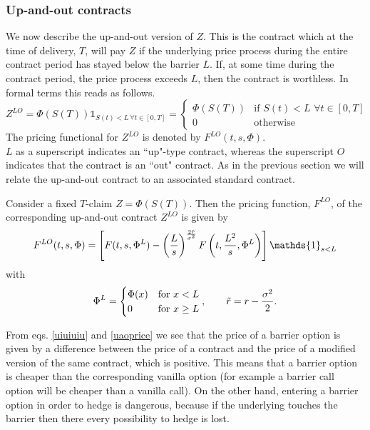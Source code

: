 \subsubsection{Up-and-out contracts}
We now describe the up-and-out version of $Z$. This is the contract which at the time of delivery, $T$, will pay $Z$ if the underlying price process during the entire contract period has stayed below the barrier $L$. If, at some time during the contract period, the price process exceeds $L$, then the contract is worthless. In formal terms this reads as follows.
\begin{equation}
    Z^{LO} = \Phi(S(T))\mathds{1}_{S(t)<L\,\forall t\in[0,T]} =
    \begin{cases}
    \Phi(S(T)) & \text{if } S(t)<L\,\,\forall t\in[0,T] \\
    0 & \text{otherwise}
    \end{cases}
\end{equation}
The pricing functional for $Z^{LO}$ is denoted by $F^{LO}(t,s,\Phi)$.\\
$L$ as a superscript indicates an ``up"-type contract, whereas the superscript $O$ indicates that the contract is an ``out" contract. As in the previous section we will relate the up-and-out contract to an associated standard contract.
\begin{theorem}
    Consider a fixed $T$-claim $Z = \Phi(S(T))$. Then the pricing function, $F^{LO}$, of the corresponding up-and-out contract $Z^{LO}$ is given by
    \begin{equation}\label{uaoprice}
        F^{LO}(t,s,\Phi) =
        \left[F(t,s,\Phi^L) - \left(\dfrac{L}{s}\right)^{\frac{2\Tilde{r}}{\sigma^2}}F\left(t,\frac{L^2}{s},\Phi^L\right)\right]\mathds{1}_{s<L}
    \end{equation}
    with
    \begin{equation}
        \Phi^L =
        \begin{cases}
        \Phi(x) & \text{for }x<L \\
        0 & \text{for }x\ge L
        \end{cases},
        \qquad \Tilde{r} = r - \frac{\sigma^2}{2}.
    \end{equation}
\end{theorem}
\begin{remark}
    From eqs. \eqref{uiuiuiu} and \eqref{uaoprice} we see that the price of a barrier option is given by a difference between the price of a contract and the price of a modified version of the same contract, which is positive. This means that a barrier option is cheaper than the corresponding vanilla option (for example a barrier call option will be cheaper than a vanilla call). On the other hand, entering a barrier option in order to hedge is dangerous, because if the underlying touches the barrier then there every possibility to hedge is lost.
\end{remark}

